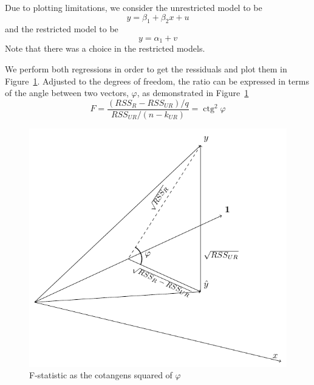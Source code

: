 \documentclass[nobib]{tufte-handout}
\DeclareMathOperator{\ctg}{ctg}
\theoremstyle{definition}
\begin{document}
Due to plotting limitations, we consider the unrestricted model to be
\[
y = \beta_1 + \beta_2 x + u
\]
and the restricted model to be
\[
y = \alpha_1 + v
\]
Note that there was a choice in the restricted models.

We perform both regressions in order to get the ressiduals and plot them
in Figure~\ref{fig:ftest}.
Adjusted to the degrees of freedom, the ratio can be expressed in terms of the
angle between two vectors, $\varphi$, as demonstrated in Figure~\ref{fig:ftest}
\[
F = \frac{(RSS_{R} - RSS_{UR})/q}{RSS_{UR}/(n-k_{UR})} = \ctg^2 \varphi
\]

\begin{figure}
\centering
\includegraphics[width=0.55\linewidth]{images/ftest.pdf}
\caption{F-statistic as the cotangens squared of $\varphi$}
\label{fig:ftest}
\end{figure}
\end{document}
